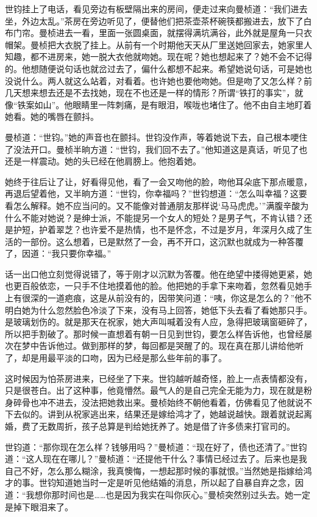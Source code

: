 \par 世钧挂上了电话，看见旁边有板壁隔出来的房间，便走过来向曼桢道：“我们进去坐，外边太乱。”茶房在旁边听见了，便替他们把茶壶茶杯碗筷都搬进去，放下了白布门帘。曼桢进去一看，里面一张圆桌面，就摆得满坑满谷，此外就是屋角一只衣帽架。曼桢把大衣脱了挂上。从前有一个时期他天天从厂里送她回家去，她家里人知趣，都不进房来，她一脱大衣他就吻她。现在呢？她也想起来了？她不会不记得的。他想随便说句话也就岔过去了，偏什么都想不起来。希望她说句话，可是她也没说什么。两人就这么站着，对看着。也许她也要他吻她。但是吻了又怎么样？前几天想来想去还是不去找她，现在不也还是一样的情形？所谓“铁打的事实”，就像“铁案如山”。他眼睛里一阵刺痛，是有眼泪，喉咙也堵住了。他不由自主地盯着她看。她的嘴唇在颤抖。
\par 曼桢道：“世钧。”她的声音也在颤抖。世钧没作声，等着她说下去，自己根本哽住了没法开口。曼桢半晌方道：“世钧，我们回不去了。”他知道这是真话，听见了也还是一样震动。她的头已经在他肩膀上。他抱着她。
\par 她终于往后让了让，好看得见他，看了一会又吻他的脸，吻他耳朵底下那点暖意，再退后望着他，又半晌方道：“世钧，你幸福吗？”世钧想道：“怎么叫幸福？这要看怎么解释。她不应当问的。又不能像对普通朋友那样说‘马马虎虎。’”满腹辛酸为什么不能对她说？是绅士派，不能提另一个女人的短处？是男子气，不肯认错？还是护短，护着翠芝？也许爱不是热情，也不是怀念，不过是岁月，年深月久成了生活的一部份。这么想着，已是默然了一会，再不开口，这沉默也就成为一种答覆了，因道：“我只要你幸福。”
\par 话一出口他立刻觉得说错了，等于刚才以沉默为答覆。他在绝望中搂得她更紧，她也更百般依恋，一只手不住地摸着他的脸。他把她的手拿下来吻着，忽然看见她手上有很深的一道疤痕，这是从前没有的，因带笑问道：“咦，你这是怎么的？”他不明白她为什么忽然脸色冷淡了下来，没有马上回答，她低下头去看了看她那只手。是玻璃划伤的。就是那天在祝家，她大声叫喊着没有人应，急得把玻璃窗砸碎了，所以把手割破了。那时候一直想着有朝一日见到世钧，要怎么样告诉他，也曾经屡次在梦中告诉他过。做到那样的梦，每回都是哭醒了的。现在真在那儿讲给他听了，却是用最平淡的口吻，因为已经是那么些年前的事了。
\par 这时候因为怕茶房进来，已经坐了下来。世钧越听越奇怪，脸上一点表情都没有，只是很苍白。出了这种事，他竟懵然。最气人的是自己完全无能为力，现在就是粉身碎骨也冲不进去，没法把她救出来。曼桢始终不朝他看着，仿佛看见了他就说不下去似的。讲到从祝家逃出来，结果还是嫁给鸿才了，她越说越快。跟着就说起离婚，费了无数周折，孩子总算是判给她抚养了。她是借了许多债来打官司的。
\par 世钧道：“那你现在怎么样？钱够用吗？”曼桢道：“现在好了，债也还清了。”世钧道：“这人现在在哪儿？”曼桢道：“还提他干什么？事情已经过去了。后来也是我自己不好，怎么那么糊涂，我真懊悔，一想起那时候的事就恨。”当然她是指嫁给鸿才的事。世钧知道她当时一定是听见他结婚的消息，所以起了自暴自弃之念，因道：“我想你那时间也是……也是因为我实在叫你灰心。”曼桢突然别过头去。她一定是掉下眼泪来了。
